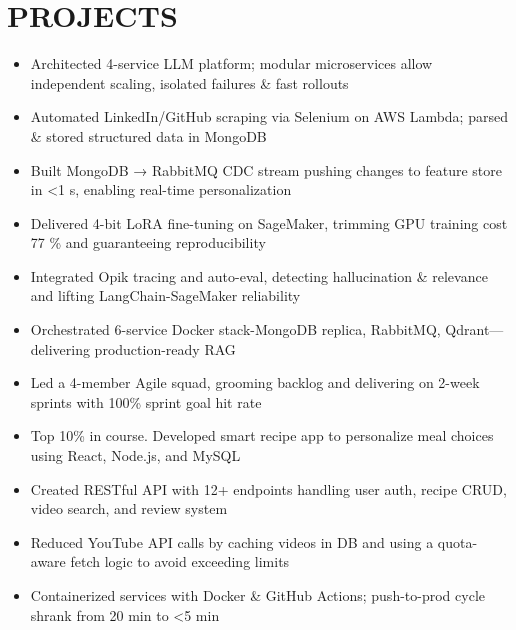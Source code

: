 \documentclass{resume}
\begin{document}
\section[PROJECTS]{PROJECTS}






 {}


\begin{itemize}
  \item Architected 4-service LLM platform; modular microservices allow independent scaling, isolated failures \& fast rollouts
  \item Automated LinkedIn/GitHub scraping via Selenium on AWS Lambda; parsed \& stored structured data in MongoDB
  \item Built MongoDB → RabbitMQ CDC stream pushing changes to feature store in <1 s, enabling real-time personalization

  \item Delivered 4-bit LoRA fine-tuning on SageMaker, trimming GPU training cost 77 \% and guaranteeing reproducibility


  \item Integrated Opik tracing and auto-eval, detecting hallucination \& relevance and lifting LangChain-SageMaker reliability
  \item Orchestrated 6-service Docker stack-MongoDB replica, RabbitMQ, Qdrant—delivering production-ready RAG


\end{itemize}



 {}

\begin{itemize}
  \item Led a 4-member Agile squad, grooming backlog and delivering on 2-week sprints with 100\% sprint goal hit rate
	\item Top 10\% in course. Developed smart recipe app to personalize meal choices using React, Node.js, and MySQL %
	\item Created RESTful API with 12+ endpoints handling user auth, recipe CRUD, video search, and review system
  \item Reduced YouTube API calls by caching videos in DB and using a quota-aware fetch logic to avoid exceeding limits
  \item Containerized services with Docker \& GitHub Actions; push-to-prod cycle shrank from 20 min to <5 min


\end{itemize}
\end{document}
